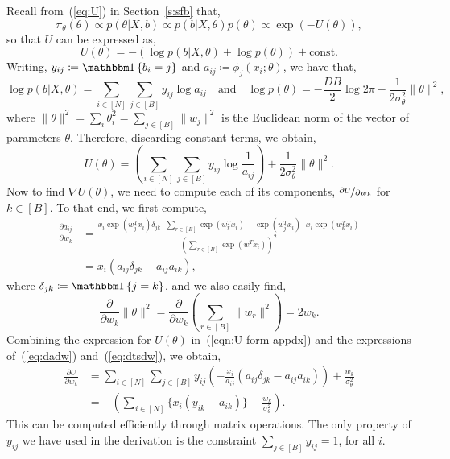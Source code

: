 Recall from~(\ref{eq:U}) in Section~\ref{s:sfb} that,
$$	\pi_\theta(\theta) \propto p(\theta | X, b) \propto p(b | X, \theta) p(\theta) \propto  \exp \left( - U(\theta) \right),
$$ 
so that $U$ can be expressed as,
$$
U(\theta) 
= - \left( \log p(b | X, \theta) + \log p(\theta) \right) + \textrm{const}.
$$
Writing,
$y_{ij} \coloneqq \one \left\{ b_i = j \right\}$ and 
$a_{ij} \coloneqq \phi_j(x_i; \theta)$, we have that,
%
\begin{equation*}
	\log p(b | X, \theta) = \sum_{i \in [N]} \sum_{j \in [B]} y_{ij} \log a_{ij}  \quad \textrm{and} \quad
	\log p(\theta) = -\frac{D B}{2} \log 2\pi - \frac{1}{2 \sigma_\theta^2} 
	\|\theta \|^2,
	\label{eqn:U-constituent-terms}
\end{equation*}
%
where
$\|\theta\|^2 = \sum_{i} \theta_{i}^2 = \sum_{j \in [B]} \|w_j\|^2$ 
is the Euclidean norm of the vector of parameters $\theta$.
Therefore, discarding constant terms, we 
obtain,
%
\begin{equation}
	U(\theta) = \left( \sum_{i \in [N]} \sum_{j \in [B]} y_{ij} \log \frac{1}{a_{ij}} \right)
	+ \frac{1}{2\sigma_\theta^2} \|\theta\|^2.
	\label{eqn:U-form-appdx}
\end{equation}
%
Now to find $\nabla U(\theta)$, we need to compute
each of its components,
$\nicefrac{\partial U}{\partial w_k}$ for $k \in [B]$.
To that end, we first compute,
%
\begin{align}
	\frac{\partial a_{ij}}{\partial w_k} &= \frac
	{x_i \exp(w_j^T x_i) \delta_{jk} \cdot \sum_{r \in [B]} \exp(w_r^T x_i) 
		- 
		\exp(w_j^T x_i) \cdot x_i \exp(w_k^T x_i)}
	{\left( \sum_{r \in [B]} \exp(w_r^T x_i) \right)^2} \nonumber \\
	&= x_i \left( a_{ij} \delta_{jk} - a_{ij}a_{ik} \right), 
	\label{eq:dadw}
\end{align}
%
where $\delta_{jk} \coloneqq \one \left\{ j = k \right\}$,
and we also easily find,
%
\begin{equation}
	\frac{ \partial}{\partial w_k} \|\theta\|^2 = \frac{\partial}{\partial w_k} \left( \sum_{r \in [B]} \|w_r\|^2 \right) = 2w_k.
	\label{eq:dtsdw}
\end{equation}
%
Combining the expression for $U(\theta)$ in~(\ref{eqn:U-form-appdx}) and the expressions of~(\ref{eq:dadw}) and~(\ref{eq:dtsdw}), we obtain,
\begin{align}
	\frac{\partial U}{\partial w_k} &= 
	\sum_{i \in [N]} \sum_{j \in [B]} y_{ij} 
	\left( -\frac{x_i}{a_{ij}} \left( a_{ij} \delta_{jk} - a_{ij} a_{ik} \right) \right)
	+ \frac{w_k}{\sigma_\theta^2} \nonumber \\
	&= - \left( \sum_{i \in [N]} \Big\{ x_i (y_{ik} - a_{ik}) \Big\} - \frac{w_k}{\sigma_\theta^2} \right).
\end{align}
%
This can be computed 
efficiently through matrix operations. The only property of $y_{ij}$ 
we have used in the derivation is the constraint $\sum_{j \in [B]} y_{ij} = 1$,
for all $i$.


